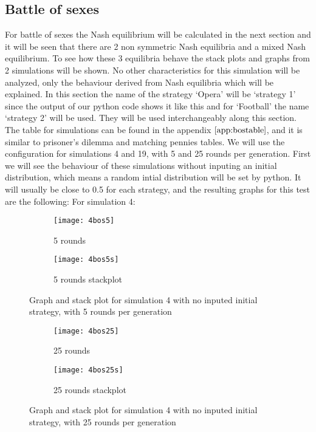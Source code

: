 \subsection{Battle of sexes}
For battle of sexes the Nash equilibrium will be calculated in the next section and it will be seen that there are 2 non symmetric Nash equilibria and a mixed Nash equilibrium. To see how these 3 equilibria behave the stack plots and graphs from 2 simulations will be shown. No other characteristics for this simulation will be analyzed, only the behaviour derived from Nash equilibria which will be explained. In this section the name of the strategy `Opera' will be `strategy 1' since the output of our python code shows it like this and for `Football' the name `strategy 2' will be used. They will be used interchangeably along this section. The table for simulations can be found in the appendix $\ref{app:bostable}$, and it is similar to prisoner's dilemma and matching pennies tables.
We will use the configuration for simulations 4 and 19, with 5 and 25 rounds per generation. First we will see the behaviour of these simulations without inputing an initial distribution, which means a random intial distribution will be set by python. It will usually be close to 0.5 for each strategy, and the resulting graphs for this test are the following:
For simulation 4:

\begin{figure}[H]       
    \centering
    \begin{subfigure}[b]{0.4\textwidth}
	\centering
	{\texttt{[image: 4bos5]}}   
    	\caption{5 rounds}
	\label{fig:bossim4r5}
    \end{subfigure}
    \hfill
    \begin{subfigure}[b]{0.4\textwidth}
	\centering
	{\texttt{[image: 4bos5s]}}   
    	\caption{5 rounds stackplot}
	\label{fig:bossim4rs5}
    \end{subfigure}
    \caption{Graph and stack plot for simulation 4 with no inputed initial strategy, with 5 rounds per generation}
    \label{bossim4simulationgsp5}
\end{figure}

\begin{figure}[H]       
    \centering
    \begin{subfigure}[b]{0.4\textwidth}
	\centering
	{\texttt{[image: 4bos25]}}   
    	\caption{25 rounds}
	\label{fig:bossim4r25}
    \end{subfigure}
    \hfill
    \begin{subfigure}[b]{0.4\textwidth}
	\centering
	{\texttt{[image: 4bos25s]}}   
    	\caption{25 rounds stackplot}
	\label{fig:bossim4rs25}
    \end{subfigure}
    \caption{Graph and stack plot for simulation 4 with no inputed initial strategy, with 25 rounds per generation}
    \label{bossim4simulationgsp25}
\end{figure}

